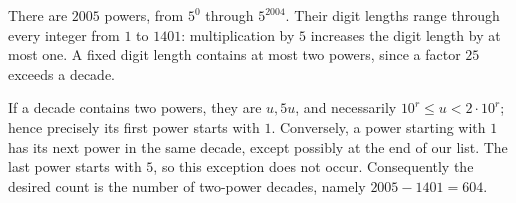 There are $2005$ powers, from $5^0$ through $5^{2004}$. Their digit lengths range through every integer from $1$ to $1401$: multiplication by $5$ increases the digit length by at most one. A fixed digit length contains at most two powers, since a factor $25$ exceeds a decade.

If a decade contains two powers, they are $u,5u$, and necessarily $10^r\le u<2\cdot10^r$; hence precisely its first power starts with $1$. Conversely, a power starting with $1$ has its next power in the same decade, except possibly at the end of our list. The last power starts with $5$, so this exception does not occur. Consequently the desired count is the number of two-power decades, namely $2005-1401=\boxed{604}$.

